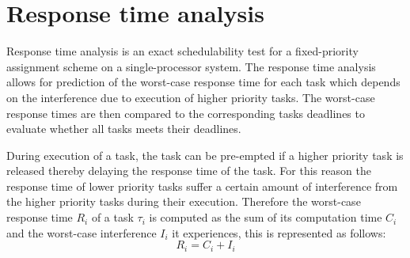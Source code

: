 \section{Response time analysis}
Response time analysis is an exact schedulability test for a fixed-priority assignment scheme on a single-processor system. 
The response time analysis allows for prediction of the worst-case response time for each task which depends on the interference due to execution of higher priority tasks. 
The worst-case response times are then compared to the corresponding tasks deadlines to evaluate whether all tasks meets their deadlines. 

During execution of a task, the task can be pre-empted if a higher priority task is released thereby delaying the response time of the task. 
For this reason the response time of lower priority tasks suffer a certain amount of interference from the higher priority tasks during their execution. 
Therefore the worst-case response time $R_i$ of a task $\tau_i$ is computed as the sum of its computation time $C_i$ and the worst-case interference $I_i$ it experiences, this is represented as follows:
\begin{equation}\label{eq:responsetime}
R_i = C_i + I_i
\end{equation}

